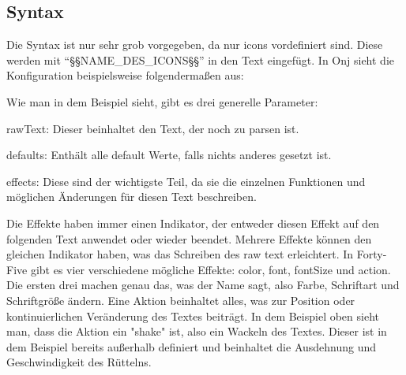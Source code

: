 
\renewcommand{\kapitelautor}{Autor: Felix Zwickelstorfer}
\subsection{Syntax}\label{subsec:syntax}
\renewcommand{\kapitelautor}{Autor: Felix Zwickelstorfer}

Die Syntax ist nur sehr grob vorgegeben, da nur icons vordefiniert sind.
Diese werden mit ``\S\S NAME\_DES\_ICONS\S\S'' in den Text eingefügt.
In Onj sieht die Konfiguration beispielsweise folgendermaßen aus:

Wie man in dem Beispiel sieht, gibt es drei generelle Parameter:
\begin{liste}
    \item rawText: Dieser beinhaltet den Text, der noch zu parsen ist.
    \item defaults: Enthält alle default Werte, falls nichts anderes gesetzt ist.
    \item effects: Diese sind der wichtigste Teil, da sie die einzelnen Funktionen und möglichen Änderungen für diesen Text beschreiben.
\end{liste}


Die Effekte haben immer einen Indikator, der entweder diesen Effekt auf den folgenden Text anwendet oder wieder beendet.
Mehrere Effekte können den gleichen Indikator haben, was das Schreiben des raw text erleichtert.
In Forty-Five gibt es vier verschiedene mögliche Effekte: color, font, fontSize und action.
Die ersten drei machen genau das, was der Name sagt, also Farbe, Schriftart und Schriftgröße ändern.
Eine Aktion beinhaltet alles, was zur Position oder kontinuierlichen Veränderung des Textes beiträgt.
In dem Beispiel oben sieht man, dass die Aktion ein "shake" ist, also ein Wackeln des Textes.
Dieser ist in dem Beispiel bereits außerhalb definiert und beinhaltet die Ausdehnung und Geschwindigkeit des Rüttelns.